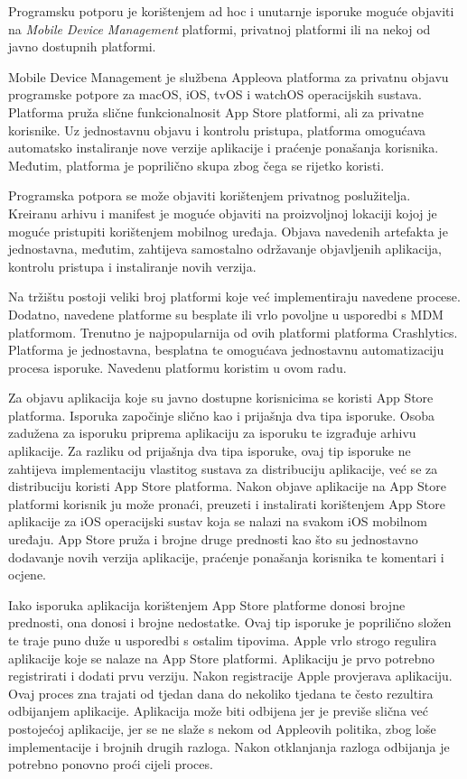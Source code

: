 \documentclass[times, utf8, diplomski, numeric]{fer}
\begin{document}
Programsku potporu je korištenjem ad hoc i unutarnje isporuke moguće objaviti na \textit{Mobile Device Management} platformi, privatnoj platformi ili na nekoj od javno dostupnih platformi.

Mobile Device Management je službena Appleova platforma za privatnu objavu programske potpore za macOS, iOS, tvOS i watchOS operacijskih sustava. Platforma pruža slične funkcionalnosit App Store platformi, ali za privatne korisnike. Uz jednostavnu objavu i kontrolu pristupa, platforma omogućava automatsko instaliranje nove verzije aplikacije i praćenje ponašanja korisnika. Međutim, platforma je poprilično skupa zbog čega se rijetko koristi.

Programska potpora se može objaviti korištenjem privatnog poslužitelja. Kreiranu arhivu i manifest je moguće objaviti na proizvoljnoj lokaciji kojoj je moguće pristupiti korištenjem mobilnog uređaja. Objava navedenih artefakta je jednostavna, međutim, zahtijeva samostalno održavanje objavljenih aplikacija, kontrolu pristupa i instaliranje novih verzija.

Na tržištu postoji veliki broj platformi koje već implementiraju navedene procese. Dodatno, navedene platforme su besplate ili vrlo povoljne u usporedbi s MDM platformom. Trenutno je najpopularnija od ovih platformi platforma Crashlytics. Platforma je jednostavna, besplatna te omogućava jednostavnu automatizaciju procesa isporuke. Navedenu platformu koristim u ovom radu.

Za objavu aplikacija koje su javno dostupne korisnicima se koristi App Store platforma. Isporuka započinje slično kao i prijašnja dva tipa isporuke. Osoba zadužena za isporuku priprema aplikaciju za isporuku te izgrađuje arhivu aplikacije. Za razliku od prijašnja dva tipa isporuke, ovaj tip isporuke ne zahtijeva implementaciju vlastitog sustava za distribuciju aplikacije, već se za distribuciju koristi App Store platforma. Nakon objave aplikacije na App Store platformi korisnik ju može pronaći, preuzeti i instalirati korištenjem App Store aplikacije za iOS operacijski sustav koja se nalazi na svakom iOS mobilnom uređaju. App Store pruža i brojne druge prednosti kao što su jednostavno dodavanje novih verzija aplikacije, praćenje ponašanja korisnika te komentari i ocjene.

Iako isporuka aplikacija korištenjem App Store platforme donosi brojne prednosti, ona donosi i brojne nedostatke. Ovaj tip isporuke je poprilično složen te traje puno duže u usporedbi s ostalim tipovima. Apple vrlo strogo regulira aplikacije koje se nalaze na App Store platformi. Aplikaciju je prvo potrebno registrirati i dodati prvu verziju. Nakon registracije Apple provjerava aplikaciju. Ovaj proces zna trajati od tjedan dana do nekoliko tjedana te često rezultira odbijanjem aplikacije. Aplikacija može biti odbijena jer je previše slična već postojećoj aplikacije, jer se ne slaže s nekom od Appleovih politika, zbog loše implementacije i brojnih drugih razloga. Nakon otklanjanja razloga odbijanja je potrebno ponovno proći cijeli proces.
\end{document}
